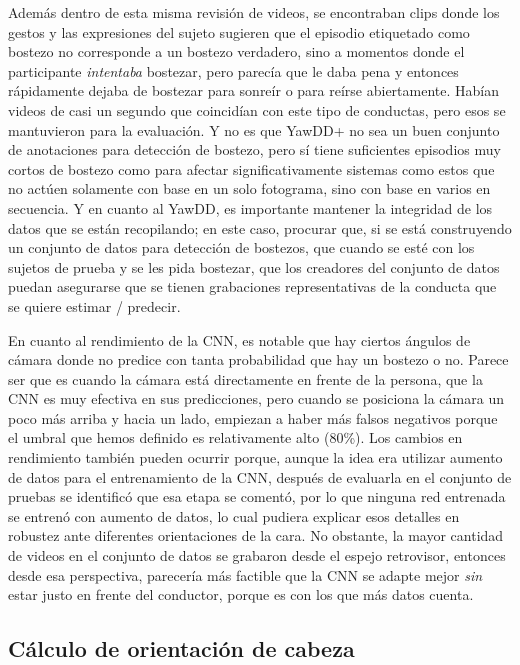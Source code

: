 Además dentro de esta misma revisión de videos, se encontraban clips donde los gestos y las expresiones del sujeto sugieren que el episodio etiquetado como bostezo no corresponde a un bostezo verdadero, sino a momentos donde el participante \textit{intentaba} bostezar, pero parecía que le daba pena y entonces rápidamente dejaba de bostezar para sonreír o para reírse abiertamente. Habían videos de casi un segundo que coincidían con este tipo de conductas, pero esos se mantuvieron para la evaluación. Y no es que YawDD+ no sea un buen conjunto de anotaciones para detección de bostezo, pero sí tiene suficientes episodios muy cortos de bostezo como para afectar significativamente sistemas como estos que no actúen solamente con base en un solo fotograma, sino con base en varios en secuencia. Y en cuanto al YawDD, es importante mantener la integridad de los datos que se están recopilando; en este caso, procurar que, si se está construyendo un conjunto de datos para detección de bostezos, que cuando se esté con los sujetos de prueba y se les pida bostezar, que los creadores del conjunto de datos puedan asegurarse que se tienen grabaciones representativas de la conducta que se quiere estimar / predecir. 

En cuanto al rendimiento de la CNN, es notable que hay ciertos ángulos de cámara donde no predice con tanta probabilidad que hay un bostezo o no. Parece ser que es cuando la cámara está directamente en frente de la persona, que la CNN es muy efectiva en sus predicciones, pero cuando se posiciona la cámara un poco más arriba y hacia un lado, empiezan a haber más falsos negativos porque el umbral que hemos definido es relativamente alto (80\%). Los cambios en rendimiento también pueden ocurrir porque, aunque la idea era utilizar aumento de datos para el entrenamiento de la CNN, después de evaluarla en el conjunto de pruebas se identificó que esa etapa se comentó, por lo que ninguna red entrenada se entrenó con aumento de datos, lo cual pudiera explicar esos detalles en robustez ante diferentes orientaciones de la cara. No obstante, la mayor cantidad de videos en el conjunto de datos se grabaron desde el espejo retrovisor, entonces desde esa perspectiva, parecería más factible que la CNN se adapte mejor \textit{sin} estar justo en frente del conductor, porque es con los que más datos cuenta. 

\subsection{Cálculo de orientación de cabeza}


